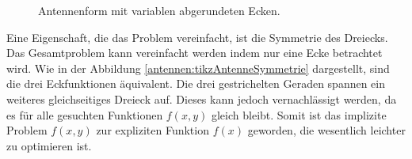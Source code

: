\begin{figure}
\begin{minipage}[t]{0.45\textwidth}
		\caption{Antennenform mit variablen abgerundeten Ecken.}
		\label{antennen:tikabgerundet_kleiner}
	\end{minipage}%
\end{figure}
Eine Eigenschaft, die das Problem vereinfacht, ist die Symmetrie des Dreiecks. 
%
Das Gesamtproblem kann vereinfacht werden indem nur eine Ecke betrachtet wird. 
Wie in der Abbildung \ref{antennen:tikzAntenneSymmetrie} dargestellt, sind die drei Eckfunktionen äquivalent. Die drei 
gestrichelten Geraden spannen ein weiteres gleichseitiges Dreieck auf. Dieses kann jedoch vernachlässigt werden, da es für alle gesuchten Funktionen $f(x,y)$ 
gleich bleibt. Somit ist das implizite Problem $f(x,y)$ zur expliziten Funktion $f(x)$ 
geworden, die wesentlich leichter zu optimieren ist.








